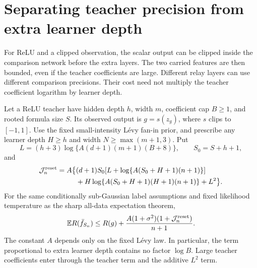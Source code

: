 \section{Separating teacher precision from extra learner depth}
\label{sec:bounded-reset-padding}
For ReLU and a clipped observation, the scalar output can be clipped
inside the comparison network before the extra layers. The two
carried features are then bounded, even if the teacher coefficients
are large. Different relay layers can use different comparison
precisions. Their cost need not multiply the teacher coefficient
logarithm by learner depth.

\begin{theorem}
\label{thm:bounded-reset-padding}
Let a ReLU teacher have hidden depth $h$, width $m$, coefficient cap
$B\ge1$, and rooted formula size $S$. Its observed output is
$g=s(z_g)$, where $s$ clips to $[-1,1]$.
Use the fixed small-intensity L\'evy fan-in prior, and prescribe any
learner depth $H\ge h$ and width $N\ge\max(m+1,3)$.
Put
\[
 L=(h+3)\log\{A(d+1)(m+1)(B+8)\},
 \qquad S_0=S+h+1,
\]
and
\begin{align}
 \mathcal J_n^{\mathrm{reset}}
 =A\bigl\{&(d+1)S_0
       [L+\log\{A(S_0+H+1)(n+1)\}]\notag\\
 &+H\log\{A(S_0+H+1)(H+1)(n+1)\}+L^2\bigr\}.
 \label{eq:reset-resource}
\end{align}
For the same conditionally sub-Gaussian label assumptions and fixed
likelihood temperature as the sharp all-data expectation theorem,
\begin{equation}
 \mathbb E R(\bar f_{S_n})
 \le R(g)+\frac{A(1+\sigma^2)(1+\mathcal J_n^{\mathrm{reset}})}{n+1}.
 \label{eq:reset-oracle}
\end{equation}
The constant $A$ depends only on the fixed L\'evy law. In particular,
the term proportional to extra learner depth contains no factor
$\log B$. Large teacher coefficients enter through the teacher term
and the additive $L^2$ term.
\end{theorem}
